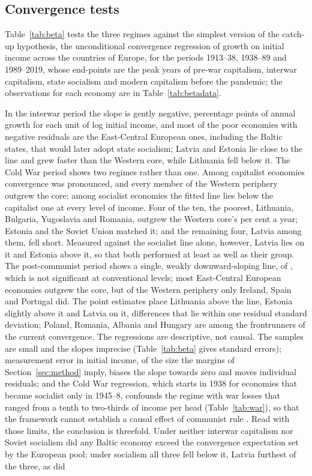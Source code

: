 \subsection{Convergence tests}

Table~\ref{tab:beta} tests the three regimes against the simplest version of the catch-up hypothesis, the unconditional convergence regression of growth on initial income across the countries of Europe, for the periods 1913--38, 1938--89 and 1989--2019, whose end-points are the peak years of pre-war capitalism, interwar capitalism, state socialism and modern capitalism before the pandemic; the observations for each economy are in Table~\ref{tab:betadata}.



In the interwar period the slope is gently negative, \betaINTERWAR{} percentage points of annual growth for each unit of log initial income, and most of the poor economies with negative residuals are the East-Central European ones, including the Baltic states, that would later adopt state socialism; Latvia and Estonia lie close to the line and grew faster than the Western core, while Lithuania fell below it. The Cold War period shows two regimes rather than one. Among capitalist economies convergence was pronounced, and every member of the Western periphery outgrew the core; among socialist economies the fitted line lies below the capitalist one at every level of income. Four of the ten, the poorest, Lithuania, Bulgaria, Yugoslavia and Romania, outgrew the Western core's  per cent a year; Estonia and the Soviet Union matched it; and the remaining four, Latvia among them, fell short. Measured against the socialist line alone, however, Latvia lies on it and Estonia above it, so that both performed at least as well as their group. The post-communist period shows a single, weakly downward-sloping line, of \betaMODERN{}, which is not significant at conventional levels; most East-Central European economies outgrew the core, but of the Western periphery only Ireland, Spain and Portugal did. The point estimates place Lithuania above the line, Estonia slightly above it and Latvia on it, differences that lie within one residual standard deviation; Poland, Romania, Albania and Hungary are among the frontrunners of the current convergence. The regressions are descriptive, not causal. The samples are small and the slopes imprecise (Table~\ref{tab:beta} gives standard errors); measurement error in initial income, of the size the margins of Section~\ref{sec:method} imply, biases the slope towards zero and moves individual residuals; and the Cold War regression, which starts in 1938 for economies that became socialist only in 1945--8, confounds the regime with war losses that ranged from a tenth to two-thirds of income per head (Table~\ref{tab:war}), so that the framework cannot establish a causal effect of communist rule \parencite[210]{klimantas2025thesis}. Read with those limits, the conclusion is threefold. Under neither interwar capitalism nor Soviet socialism did any Baltic economy exceed the convergence expectation set by the European pool; under socialism all three fell below it, Latvia furthest of the three, as did 